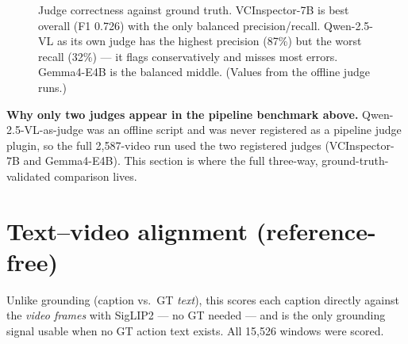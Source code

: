 \documentclass[10pt,letterpaper]{article}
\begin{document}
\begin{figure}[H]
\centering
{}
\caption{Judge correctness against ground truth. VCInspector-7B is best overall (F1 0.726) with
the only balanced precision/recall. Qwen-2.5-VL as its own judge has the highest precision (87\%)
but the worst recall (32\%) --- it flags conservatively and misses most errors. Gemma4-E4B is the
balanced middle. (Values from the offline judge runs.)}
\end{figure}

\textbf{Why only two judges appear in the pipeline benchmark above.} Qwen-2.5-VL-as-judge was an
offline script and was never registered as a pipeline judge plugin, so the full 2{,}587-video run
used the two registered judges (VCInspector-7B and Gemma4-E4B). This section is where the full
three-way, ground-truth-validated comparison lives.

\section{Text--video alignment (reference-free)}

Unlike grounding (caption vs.\ GT \emph{text}), this scores each caption directly against the
\emph{video frames} with SigLIP2 --- no GT needed --- and is the only grounding signal usable when
no GT action text exists. All 15{,}526 windows were scored.
\end{document}
